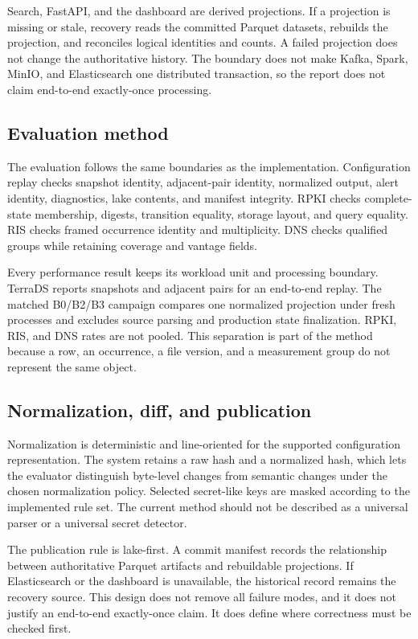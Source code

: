 \documentclass[a4paper,11pt]{article}
\begin{document}
Search, FastAPI, and the dashboard are derived projections. If a projection is missing or stale, recovery reads the committed Parquet datasets, rebuilds the projection, and reconciles logical identities and counts. A failed projection does not change the authoritative history. The boundary does not make Kafka, Spark, MinIO, and Elasticsearch one distributed transaction, so the report does not claim end-to-end exactly-once processing.

\subsection{Evaluation method}

The evaluation follows the same boundaries as the implementation. Configuration replay checks snapshot identity, adjacent-pair identity, normalized output, alert identity, diagnostics, lake contents, and manifest integrity. RPKI checks complete-state membership, digests, transition equality, storage layout, and query equality. RIS checks framed occurrence identity and multiplicity. DNS checks qualified groups while retaining coverage and vantage fields.

Every performance result keeps its workload unit and processing boundary. TerraDS reports snapshots and adjacent pairs for an end-to-end replay. The matched B0/B2/B3 campaign compares one normalized projection under fresh processes and excludes source parsing and production state finalization. RPKI, RIS, and DNS rates are not pooled. This separation is part of the method because a row, an occurrence, a file version, and a measurement group do not represent the same object.

\subsection{Normalization, diff, and publication}

Normalization is deterministic and line-oriented for the supported configuration representation. The system retains a raw hash and a normalized hash, which lets the evaluator distinguish byte-level changes from semantic changes under the chosen normalization policy. Selected secret-like keys are masked according to the implemented rule set. The current method should not be described as a universal parser or a universal secret detector.

The publication rule is lake-first. A commit manifest records the relationship between authoritative Parquet artifacts and rebuildable projections. If Elasticsearch or the dashboard is unavailable, the historical record remains the recovery source. This design does not remove all failure modes, and it does not justify an end-to-end exactly-once claim. It does define where correctness must be checked first.
\end{document}

